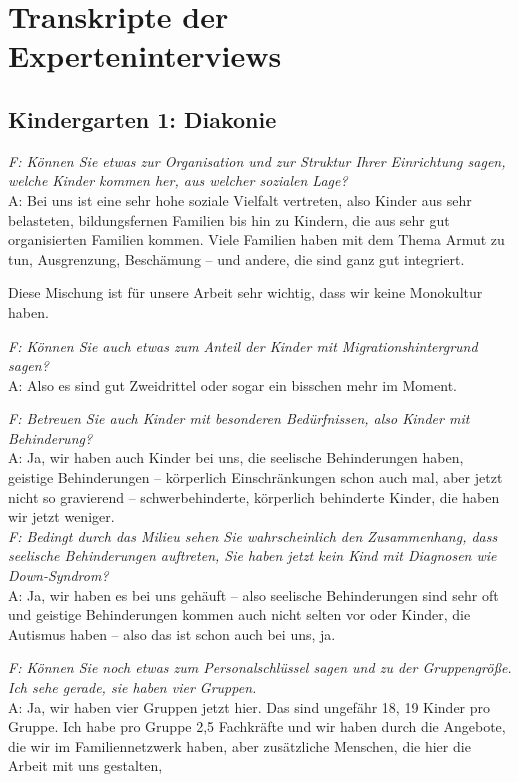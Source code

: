 \chapter{Transkripte der Experteninterviews}
\section{Kindergarten 1: Diakonie}
\begin{linenumbers*}
\emph{F: Können Sie etwas zur Organisation und zur Struktur Ihrer Einrichtung sagen, welche Kinder kommen her, aus welcher sozialen Lage?}\\
A: Bei uns ist eine sehr hohe soziale Vielfalt vertreten, also Kinder aus sehr belasteten, bildungsfernen Familien bis hin zu Kindern, die aus sehr gut organisierten Familien kommen. Viele Familien haben mit dem Thema Armut zu tun, Ausgrenzung, Beschämung -- und andere, die sind ganz gut integriert. 

Diese Mischung ist für unsere Arbeit sehr wichtig, dass wir keine Monokultur haben.

\emph{F: Können Sie auch etwas zum Anteil der Kinder mit Migrationshintergrund sagen?}\\
A: Also es sind gut Zweidrittel oder sogar ein bisschen mehr im Moment. 

\emph{F: Betreuen Sie auch Kinder mit besonderen Bedürfnissen, also Kinder mit Behinderung?}\\
A: Ja, wir haben auch Kinder bei uns, die seelische Behinderungen haben, geistige Behinderungen -- körperlich Einschränkungen schon auch mal, aber jetzt nicht so gravierend -- schwerbehinderte, körperlich behinderte Kinder, die haben wir jetzt weniger.\\
\emph{F: Bedingt durch das Milieu sehen Sie wahrscheinlich den Zusammenhang, dass seelische Behinderungen auftreten, Sie haben jetzt kein Kind mit Diagnosen wie Down-Syndrom?}\\ 
A: Ja, wir haben es bei uns gehäuft -- also seelische Behinderungen sind sehr oft und geistige Behinderungen kommen auch nicht selten vor oder Kinder, die Autismus haben -- also das ist schon auch bei uns, ja.

\emph{F: Können Sie noch etwas zum Personalschlüssel sagen und zu der Gruppengröße. Ich sehe gerade, sie haben vier Gruppen.}\\
A: Ja, wir haben vier Gruppen jetzt hier. Das sind ungefähr 18, 19 Kinder pro Gruppe. Ich habe pro Gruppe 2,5 Fachkräfte und wir haben durch die Angebote, die wir im Familiennetzwerk haben, aber zusätzliche Menschen, die hier die Arbeit mit uns gestalten, 


\end{linenumbers*}
